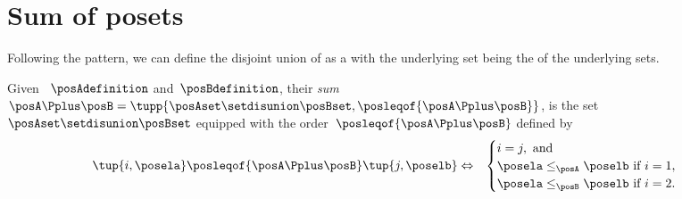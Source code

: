 
\section{Sum of posets}

Following the pattern, we can define the disjoint union of  as a  with the underlying set being the  of the underlying sets.
\begin{ctdefinition}
    \label{def:disjoint-union-of-posets}
    Given ~$\posAdefinition$ and~$\posBdefinition$, their \emph{sum}~$\posA\Pplus\posB=\tupp{\posAset \setdisunion \posBset, {{\posleqof{\posA \Pplus \posB}}}}$, is the set $\posAset \setdisunion \posBset$ equipped with the order~$\posleqof{\posA \Pplus \posB}$ defined by
    \begin{equation} \label{eq:poset-disunion}
        \begin{aligned}
            \tup{i, \posela} \posleqof{\posA\Pplus\posB}  \tup{ j, \poselb}
             & \Leftrightarrow &
            \begin{cases}
                i = j, \text{ and}                            \\
                \posela \leq_\posA \poselb \text{ if } i = 1, \\
                \posela \leq_\posB \poselb \text{ if } i = 2.
            \end{cases}
        \end{aligned}
    \end{equation}
\end{ctdefinition}

